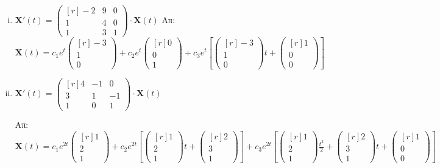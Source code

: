 \begin{enumerate}
\begin{enumerate}[i)]
			\item $ \mathbf{X}'(t) = 
				\begin{pmatrix*}[r]
					-2 & 9 & 0 \\
					1 & 4 & 0 \\
					1 & 3 & 1
				\end{pmatrix*} \cdot 
				\mathbf{X}(t) $
				\hfill Απ: {\scriptsize $ \mathbf{X}(t) = c_{1}e^{t} 
					\begin{pmatrix*}[r] -3 \\ 1 \\ 0 \end{pmatrix*} + c_{2} e^{t}
					\begin{pmatrix*}[r] 0 \\ 0 \\ 1 \end{pmatrix*} + c_{3} e^{t} \left[
					 \begin{pmatrix*}[r] -3 \\ 1 \\ 0 \end{pmatrix*}t +
			 \begin{pmatrix*}[r] 1 \\ 0 \\ 0 \end{pmatrix*} \right] $}

		 \item $ \mathbf{X}'(t) = 
			 \begin{pmatrix*}[r]
				 4 & -1 & 0 \\
				 3 & 1 & -1 \\
				 1 & 0 & 1
			 \end{pmatrix*} \cdot 
			 \mathbf{X}(t)$

			 \hfill Απ: {\scriptsize $ \mathbf{X}(t)= c_{1} e^{2t}
			 \begin{pmatrix*}[r] 1 \\ 2 \\ 1 \end{pmatrix*} + c_{2}e^{2t} \left[ 
		 \begin{pmatrix*}[r] 1 \\ 2 \\ 1 \end{pmatrix*}t + 
 \begin{pmatrix*}[r] 2 \\ 3 \\ 1 \end{pmatrix*} \right] + c_{3}e^{2t} \left[
 \begin{pmatrix*}[r] 1 \\ 2 \\ 1 \end{pmatrix*} \frac{t^{2}}{2} +  
 \begin{pmatrix*}[r] 2 \\ 3 \\ 1 \end{pmatrix*} t + 
 \begin{pmatrix*}[r] 1 \\ 0 \\ 0 \end{pmatrix*}\right]  $} 


\end{enumerate}
\end{enumerate}
